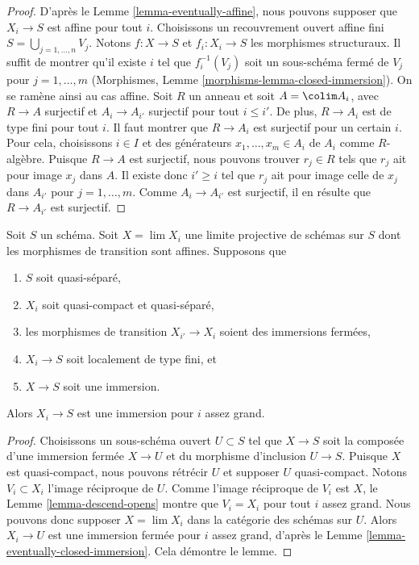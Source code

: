 \begin{proof}
D'après le Lemme \ref{lemma-eventually-affine}, nous pouvons supposer que
$X_i \to S$ est affine pour tout $i$. Choisissons un recouvrement ouvert
affine fini $S = \bigcup_{j = 1, \ldots, n} V_j$. Notons $f : X \to S$ et
$f_i : X_i \to S$ les morphismes structuraux. Il suffit de montrer qu'il
existe $i$ tel que $f_i^{-1}(V_j)$ soit un sous-schéma fermé de $V_j$ pour
$j = 1, \ldots, m$ (Morphismes,
Lemme \ref{morphisms-lemma-closed-immersion}). On se ramène ainsi au cas
affine. Soit $R$ un anneau et soit $A = \colim A_i$, avec $R \to A$
surjectif et $A_i \to A_{i'}$ surjectif pour tout $i \leq i'$. De plus,
$R \to A_i$ est de type fini pour tout $i$. Il faut montrer que
$R \to A_i$ est surjectif pour un certain $i$. Pour cela, choisissons
$i \in I$ et des générateurs $x_1, \ldots, x_m \in A_i$ de $A_i$ comme
$R$-algèbre. Puisque $R \to A$ est surjectif, nous pouvons trouver
$r_j \in R$ tels que $r_j$ ait pour image $x_j$ dans $A$. Il existe donc $i' \geq i$ tel
que $r_j$ ait pour image celle de $x_j$ dans $A_{i'}$ pour
$j = 1, \ldots, m$. Comme $A_i \to A_{i'}$ est surjectif, il en résulte que
$R \to A_{i'}$ est surjectif.
\end{proof}

\begin{lemma}
\label{lemma-eventually-immersion}
Soit $S$ un schéma. Soit $X = \lim X_i$ une limite projective de schémas sur
$S$ dont les morphismes de transition sont affines. Supposons que
\begin{enumerate}
\item $S$ soit quasi-séparé,
\item $X_i$ soit quasi-compact et quasi-séparé,
\item les morphismes de transition $X_{i'} \to X_i$ soient des immersions
fermées,
\item $X_i \to S$ soit localement de type fini, et
\item $X \to S$ soit une immersion.
\end{enumerate}
Alors $X_i \to S$ est une immersion pour $i$ assez grand.
\end{lemma}

\begin{proof}
Choisissons un sous-schéma ouvert $U \subset S$ tel que $X \to S$ soit la
composée d'une immersion fermée $X \to U$ et du morphisme d'inclusion
$U \to S$. Puisque $X$ est quasi-compact, nous pouvons rétrécir $U$ et
supposer $U$ quasi-compact. Notons $V_i \subset X_i$ l'image réciproque de $U$.
Comme l'image réciproque de $V_i$ est $X$, le
Lemme \ref{lemma-descend-opens} montre que $V_i = X_i$ pour tout $i$ assez
grand. Nous pouvons donc supposer $X = \lim X_i$ dans la catégorie des
schémas sur $U$. Alors $X_i \to U$ est une immersion fermée pour $i$ assez grand,
d'après le Lemme \ref{lemma-eventually-closed-immersion}. Cela
démontre le lemme.
\end{proof}










